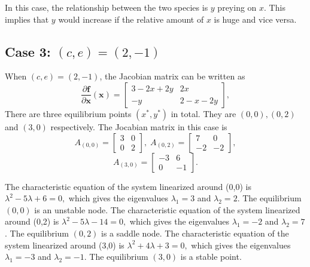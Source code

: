 \documentclass[a4paper,twocolumn]{article} %
\begin{document}
In this case, the relationship between the two species is $y$ preying on $x$. This implies that $y$ would increase if the relative amount of $x$ is huge and vice versa.

\subsection*{Case 3: $(c,e)=(2,-1)$}
When $(c,e)=(2,-1)$, the Jacobian matrix can be written as
\begin{equation*}
    \frac{\partial\textbf{f}}{\partial \textbf{x}}(\textbf{x}) =
    \left[\begin{array}{cc}
    3-2x+2y & 2x \\
    -y & 2-x-2y
    \end{array}\right],
\end{equation*}
There are three equilibrium points $(x^*,y^*)$ in total. They are $(0,0),(0,2)$ and $(3,0)$ respectively. The Jocabian matrix in this case is
\begin{equation*}
    A_{(0,0)} =
    \left[\begin{array}{cc}
    3 & 0 \\
    0 & 2
    \end{array}\right], \; A_{(0,2)} =
    \left[\begin{array}{cc}
    7 & 0 \\
    -2 & -2
    \end{array}\right],   
    \end{equation*}
    \begin{equation*}
    A_{(3,0)} =
    \left[\begin{array}{cc}
    -3 & 6 \\
    0 & -1
    \end{array}\right].
\end{equation*}

The characteristic equation of the system linearized around \mbox{(0,0)} is
$\lambda^2 -5 \lambda + 6 = 0,$ which gives the eigenvalues $\lambda_{1} = 3$ and $\lambda_{2} = 2$. The equilibrium $(0,0)$ is an unstable node. 
The characteristic equation of the system linearized around \mbox{(0,2)} is
$\lambda^2 -5 \lambda - 14 = 0,$ which gives the eigenvalues $\lambda_1 = -2$ and $\lambda_2 = 7$. The equilibrium $(0,2)$ is a saddle node. 
The characteristic equation of the system linearized around \mbox{(3,0)} is
$\lambda^2 +4 \lambda + 3 = 0,$ which gives the eigenvalues $\lambda_1 = -3$ and $\lambda_2 = -1$. The equilibrium $(3,0)$ is a stable point.
\end{document}
